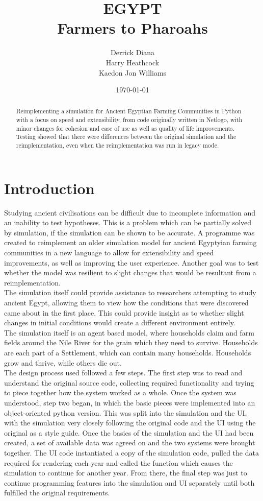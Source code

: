 \documentclass[12pt]{article}
\title{EGYPT\\Farmers to Pharoahs}
\author{Derrick Diana\\Harry Heathcock\\Kaedon Jon Williams}
\date{\today}
\begin{document}
	\maketitle
	\begin{abstract}
		Reimplementing a simulation for Ancient Egyptian Farming Communities in Python with a focus on speed and extensibility, from code originally written in Netlogo, with minor changes for cohesion and ease of use as well as quality of life improvements. Testing showed that there were differences between the original simulation and the reimplementation, even when the reimplementation was run in legacy mode.
	\end{abstract}
	
	\section{Introduction}
		Studying ancient civilisations can be difficult due to incomplete information and an inability to test hypotheses. This is a problem which can be partially solved by simulation, if the simulation can be shown to be accurate. A programme was created to reimplement an older simulation model for ancient Egyptyian farming communities in a new language to allow for extensibility and speed improvements, as well as improving the user experience. Another goal was to test whether the model was resilient to slight changes that would be resultant from a reimplementation.\\
		The simulation itself could provide assistance to researchers attempting to study ancient Egypt, allowing them to view how the conditions that were discovered came about in the first place. This could provide insight as to whether slight changes in initial conditions would create a different environment entirely.\\
		The simulation itself is an agent based model, where households claim and farm fields around the Nile River for the grain which they need to survive. Households are each part of a Settlement, which can contain many households. Households grow and thrive, while others die out.\\
		The design process used followed a few steps. The first step was to read and understand the original source code, collecting required functionality and trying to piece together how the system worked as a whole. Once the system was understood, step two began, in which the basic pieces were implemented into an object-oriented python version. This was split into the simulation and the UI, with the simulation very closely following the original code and the UI using the original as a style guide. Once the basics of the simulation and the UI had been created, a set of available data was agreed on and the two systems were brought together. The UI code instantiated a copy of the simulation code, pulled the data required for rendering each year and called the function which causes the simulation to continue for another year. From there, the final step was just to continue programming features into the simulation and UI separately until both fulfilled the original requirements.
\end{document}
